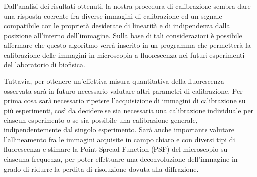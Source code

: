Dall'analisi dei risultati ottenuti, la nostra procedura di calibrazione sembra dare una risposta coerente fra diverse immagini di calibrazione ed un segnale compatibile con le proprietà desiderate di linearità e di indipendenza dalla posizione all'interno dell'immagine. 
Sulla base di tali considerazioni è possibile affermare che questo algoritmo verrà inserito in un programma che permetterà la calibrazione delle immagini in microscopia a fluorescenza nei futuri esperimenti del laboratorio di biofisica.

Tuttavia, per ottenere un'effettiva misura quantitativa della fluorescenza osservata sarà in futuro necessario valutare altri parametri di calibrazione.
Per prima cosa sarà necessario ripetere l'acquisizione di immagini di calibrazione su più esperimenti, così da decidere se sia necessaria una calibrazione individuale per ciascun esperimento o se sia possibile una calibrazione generale, indipendentemente dal singolo esperimento.
Sarà anche importante valutare l'allineamento fra le immagini acquisite in campo chiaro e con diversi tipi di fluorescenza e stimare la Point Spread Function (PSF) del microscopio su ciascuna frequenza, per poter effettuare una deconvoluzione dell'immagine in grado di ridurre la perdita di risoluzione dovuta alla diffrazione.
